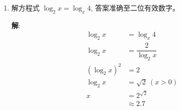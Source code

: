 \documentclass{report}
\newcommand{\sol}{\vspace{0.2cm}\textbf{解}:}
\begin{document}
\begin{multicols*}{2}
\begin{enumerate}[leftmargin=*]
              \sol{}
              \begin{align*}
                  4 \log_9 x          & = 4 + 3 \log_x 9 \\
                  \dfrac{4}{\log_x 9} & = 4 + 3 \log_x 9 \\
              \end{align*}
              设 $y = \log_x 9$, 则
              \begin{align*}
                  \dfrac{4}{y}    & = 4 + 3y           \\
                  4               & = 4y + 3y^2        \\
                  3y^2 + 4y - 4   & = 0                \\
                  (3y - 2)(y + 2) & = 0                \\
                  y               & = \dfrac{2}{3}, -2
              \end{align*}
              当 $y = \dfrac{2}{3}$ 时,
              \begin{align*}
                  \log_x 9        & = \dfrac{2}{3}    \\
                  x^{\frac{2}{3}} & = 9               \\
                  x               & = 9^{\frac{3}{2}} \\
                                  & = 27
              \end{align*}
              当 $y = -2$ 时,
              \begin{align*}
                  \log_x 9 & = -2           \\
                  x^{-2}   & = 9            \\
                  x        & = \dfrac{1}{3}
              \end{align*}
              $\therefore x = 27$ 或 $x = \dfrac{1}{3}$.

        \item 解方程式 $\log _2 x=\log _x 4$, 答案准确至二位有效数字。

              \sol{}
              \begin{align*}
                  \log_2 x     & = \log_x 4            \\
                  \log_2 x     & = \dfrac{2}{\log_2 x} \\
                  (\log_2 x)^2 & = 2                   \\
                  \log_2 x     & = \sqrt{2}\ (x > 0)   \\
                  x            & = 2^{\sqrt{2}}        \\
                               & \approx 2.7
              \end{align*}


\end{enumerate}
\end{multicols*}
\end{document}
